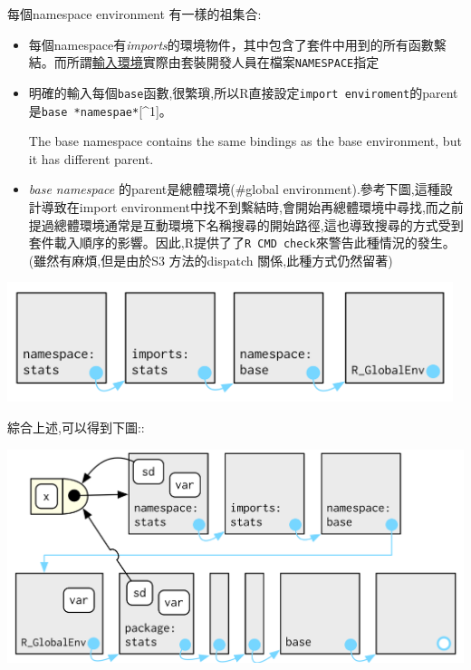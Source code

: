 \documentclass[]{book}
\theoremstyle{definition}
\theoremstyle{definition}
\theoremstyle{definition}
\theoremstyle{remark}
\begin{document}
每個namespace environment 有一樣的祖集合:

\begin{itemize}
\item
  每個namespace有\emph{imports}的環境物件，其中包含了套件中用到的所有函數繫結。而所謂\protect\hyperlink{imports-environment}{輸入環境}實際由套裝開發人員在檔案\texttt{NAMESPACE}指定
\item
  明確的輸入每個\texttt{base}函數,很繁瑣,所以R直接設定\texttt{import\ enviroment}的parent是\texttt{base\ *namespae*}{[}\^{}1{]}。

  The base namespace contains the same bindings as the base environment,
  but it has different parent.
\item
  \emph{base namespace} 的parent是總體環境(\#global
  environment).參考下圖,這種設計導致在import
  environment中找不到繫結時,會開始再總體環境中尋找,而之前提過總體環境通常是互動環境下名稱搜尋的開始路徑,這也導致搜尋的方式受到套件載入順序的影響。因此,R提供了了\texttt{R\ CMD\ check}來警告此種情況的發生。(雖然有麻煩,但是由於S3
  方法的dispatch 關係,此種方式仍然留著)
\end{itemize}

\begin{center}\includegraphics[width=5.12in]{diagrams/environments/namespace-env} \end{center}

綜合上述,可以得到下圖::

\begin{center}\includegraphics[width=5.9in]{diagrams/environments/namespace} \end{center}
\end{document}
